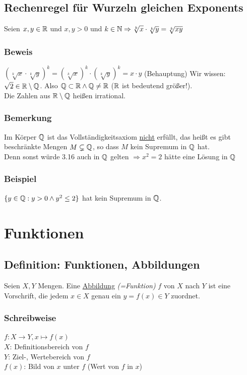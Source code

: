 \section{Rechenregel für Wurzeln gleichen Exponents}\label{3.17}
Seien $x,y \in \mathbb{R}$ und $x,y > 0$ und $k \in \mathbb{N} \Rightarrow \sqrt[k]{x} \cdot \sqrt[k]{y} = \sqrt[k]{xy}$

\subsection*{Beweis}
$\left(\sqrt[k]{x} \cdot \sqrt[k]{y}\right)^k = \left(\sqrt[k]{x}\right)^k \cdot \left(\sqrt[k]{y}\right)^k = x \cdot y$ (Behauptung)\nl
Wir wissen: $\sqrt{2} \in \mathbb{R} \setminus \mathbb{Q}$. Also $\mathbb{Q} \subset \mathbb{R} \wedge \mathbb{Q} \neq \mathbb{R}$ ($\mathbb{R}$ ist bedeutend größer!).\\
Die Zahlen aus $\mathbb{R} \setminus \mathbb{Q}$ heißen irrational.

\subsection*{Bemerkung}
Im Körper $\mathbb{Q}$ ist das Vollständigkeitsaxiom \underline{nicht} erfüllt, das heißt es gibt beschränkte Mengen $M \subsetneq \mathbb{Q}$, so dass $M$ kein Supremum in $\mathbb{Q}$ hat.\\
Denn sonst würde 3.16 auch in $\mathbb{Q}$ gelten $\Rightarrow x^2=2$ hätte eine Lösung in $\mathbb{Q}$ \wspruch

\subsection*{Beispiel}
$\{y \in \mathbb{Q} : y > 0 \wedge y^2 \le 2 \}$ hat kein Supremum in $\mathbb{Q}$.

\newpage

\chapter{Funktionen}\label{P4}
\section{Definition: Funktionen, Abbildungen}\label{4.1}
Seien $X, Y$ Mengen. Eine \underline{Abbildung} \emph{(=Funktion)} $f$ von $X$ nach $Y$ ist eine Vorschrift, die jedem $x \in X$ genau ein $y=f(x) \in Y$ zuordnet.

\subsection*{Schreibweise}
$f: X \to Y, x \mapsto f(x)$\\
$X$: Definitionsbereich von $f$\\
$Y$: Ziel-, Wertebereich von $f$\\
$f(x)$: Bild von $x$ unter $f$ (Wert von $f$ in $x$)

